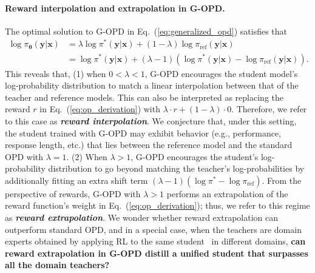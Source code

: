 \documentclass{article} %
\begin{document}
\paragraph{Reward interpolation and extrapolation in G-OPD.} The optimal solution to G-OPD in Eq.~(\ref{eq:generalized_opd}) satisfies that 
\begin{equation}
\label{eq:g-opd optimal solution}
\begin{aligned}
\log \pi_{\boldsymbol{\theta}} (\boldsymbol{y} | \boldsymbol{x}) & = \lambda \log  \pi^{*} (\boldsymbol{y} | \boldsymbol{x}) + (1-\lambda) \log \pi_{\mathrm{ref}} (\boldsymbol{y} | \boldsymbol{x}) \\ & = \log  \pi^{*} (\boldsymbol{y} | \boldsymbol{x})  + (\lambda - 1) (\log  \pi^{*} (\boldsymbol{y} | \boldsymbol{x})  - \log  \pi_{\mathrm{ref}} (\boldsymbol{y} | \boldsymbol{x}) ).
\end{aligned}
\end{equation}
This reveals that, (1) when $0<\lambda < 1$, G-OPD encourages the student model's log-probability distribution to match a linear interpolation between that of the teacher and reference models. This can also be interpreted as replacing the reward $r$ in Eq.~(\ref{eq:op_derivation}) with $\lambda \cdot r + (1-\lambda)\cdot 0$. Therefore, we refer to this case as \emph{\textbf{reward interpolation}}. We conjecture that, under this setting, the student trained with G-OPD may exhibit behavior (e.g., performance, response length, etc.) that lies between the reference model and the standard OPD with $\lambda=1$. (2) When $\lambda>1$, G-OPD encourages the student's log-probability distribution to go beyond matching the teacher's log-probabilities by additionally fitting an extra shift term $(\lambda - 1)(\log \pi^{*} - \log \pi_{\mathrm{ref}})$. From the perspective of rewards, G-OPD with $\lambda > 1$ performs an extrapolation of the reward function's weight in Eq.~(\ref{eq:op_derivation}); thus, we refer to this regime as \emph{\textbf{reward extrapolation}}. We wonder whether reward extrapolation can outperform standard OPD, and in a special case, when the teachers are domain experts obtained by applying RL to the same student~\citep{mimo} in different domains, \textbf{can reward extrapolation in G-OPD distill a unified student that surpasses all the domain teachers?}
\end{document}
